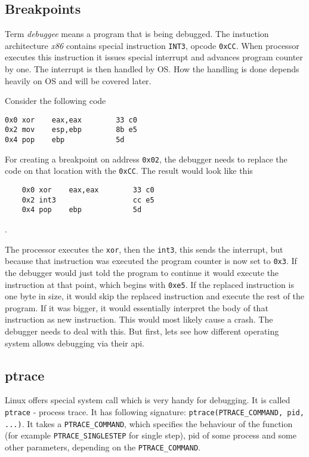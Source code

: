 \subsection{Breakpoints}
Term \textit{debuggee} means a program that is being debugged. The instuction architecture \textit{x86} contains special instruction \lstinline{INT3}, opcode \lstinline{0xCC}. When processor executes this instruction it issues special interrupt and advances program counter by one. The interrupt is then handled by OS. How the handling is done depends heavily on OS and will be covered later. 

Consider the following code
\begin{lstlisting}
0x0 xor    eax,eax        33 c0
0x2 mov    esp,ebp        8b e5
0x4 pop    ebp            5d
\end{lstlisting}

For creating a breakpoint on address \lstinline{0x02}, the debugger needs to replace the code on that location with the \lstinline{0xCC}. The result would look like this

\begin{lstlisting}
    0x0 xor    eax,eax        33 c0
    0x2 int3                  cc e5
    0x4 pop    ebp            5d
\end{lstlisting}.

The processor executes the \lstinline{xor}, then the \lstinline{int3}, this sends the interrupt, but because that instruction was executed the program counter is now set to \lstinline{0x3}. If the debugger would just told the program to continue it would execute the instruction at that point, which begins with \lstinline{0xe5}. If the replaced instruction is one byte in size, it would skip the replaced instruction and execute the rest of the program. If it was bigger, it would essentially interpret the body of that instruction as new instruction. This would most likely cause a crash. The debugger needs to deal with this. But first, lets see how different operating system allows debugging via their api.

\subsection{ptrace}
Linux offers special system call which is very handy for debugging. It is called \lstinline{ptrace} \cite{ptrace} - process trace. It has following signature: \lstinline{ptrace(PTRACE_COMMAND, pid, ...)}. It takes a \lstinline{PTRACE_COMMAND}, which specifies the behaviour of the function (for example \lstinline{PTRACE_SINGLESTEP} for single step), pid of some process and some other parameters, depending on the \lstinline{PTRACE_COMMAND}. 

